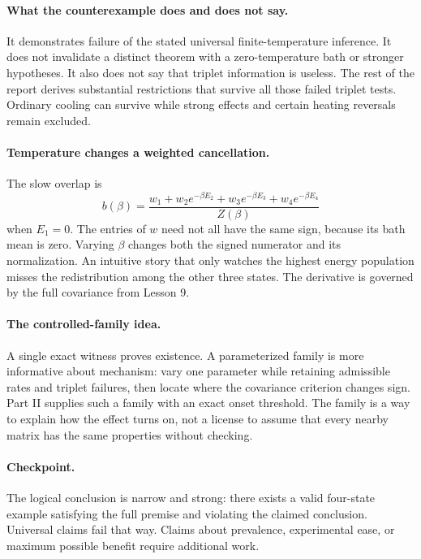 \documentclass[11pt]{article}
\begin{document}
\paragraph{What the counterexample does and does not say.}
It demonstrates failure of the stated universal finite-temperature
inference. It does not invalidate a distinct theorem with a zero-temperature
bath or stronger hypotheses. It also does not say that triplet information
is useless. The rest of the report derives substantial restrictions that
survive all those failed triplet tests. Ordinary cooling can survive while
strong effects and certain heating reversals remain excluded.

\paragraph{Temperature changes a weighted cancellation.}
The slow overlap is
\[
b(\beta)=\frac{w_1+w_2e^{-\beta E_2}
+w_3e^{-\beta E_3}+w_4e^{-\beta E_4}}{Z(\beta)}
\]
when $E_1=0$. The entries of $w$ need not all have the same sign, because
its bath mean is zero. Varying $\beta$ changes both the signed numerator
and its normalization. An intuitive story that only watches the highest
energy population misses the redistribution among the other three states.
The derivative is governed by the full covariance from Lesson 9.

\paragraph{The controlled-family idea.}
A single exact witness proves existence. A parameterized family is more
informative about mechanism: vary one parameter while retaining admissible
rates and triplet failures, then locate where the covariance criterion
changes sign. Part II supplies such a family with an exact onset threshold.
The family is a way to explain how the effect turns on, not a license to
assume that every nearby matrix has the same properties without checking.

\paragraph{Checkpoint.}
The logical conclusion is narrow and strong: there exists a valid
four-state example satisfying the full premise and violating the claimed
conclusion. Universal claims fail that way. Claims about prevalence,
experimental ease, or maximum possible benefit require additional work.
\end{document}
